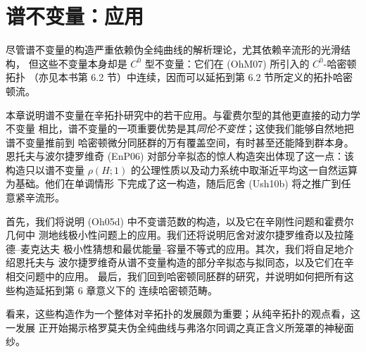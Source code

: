 \chapter{谱不变量：应用}
\label{ch:spectral-applications}

尽管谱不变量的构造严重依赖伪全纯曲线的解析理论，尤其依赖辛流形的光滑结构，
但这些不变量本身却是 $C^0$ 型不变量：它们在 (OhM07) 所引入的 $C^0$-哈密顿拓扑
（亦见本书第 6.2 节）中连续，因而可以延拓到第 6.2 节所定义的拓扑哈密顿流。

本章说明谱不变量在辛拓扑研究中的若干应用。与霍费尔型的其他更直接的动力学不变量
相比，谱不变量的一项重要优势是其\emph{同伦不变性}；这使我们能够自然地把谱不变量推前到
哈密顿微分同胚群的万有覆盖空间，有时甚至还能降到群本身。恩托夫与波尔捷罗维奇
(EnP06) 对部分辛拟态的惊人构造突出体现了这一点：该构造只以谱不变量
$\rho(H;1)$ 的公理性质以及动力系统中取渐近平均这一自然运算为基础。他们在单调情形
下完成了这一构造，随后厄舍 (Ush10b) 将之推广到任意紧辛流形。

首先，我们将说明 (Oh05d) 中不变谱范数的构造，以及它在辛刚性问题和霍费尔几何中
测地线极小性问题上的应用。我们还将说明厄舍对波尔捷罗维奇以及拉隆德--麦克达夫
极小性猜想和最优能量--容量不等式的应用。其次，我们将自足地介绍恩托夫与
波尔捷罗维奇从谱不变量构造的部分辛拟态与拟同态，以及它们在辛相交问题中的应用。
最后，我们回到哈密顿同胚群的研究，并说明如何把所有这些构造延拓到第 6 章意义下的
连续哈密顿范畴。

看来，这些构造作为一个整体对辛拓扑的发展颇为重要；从纯辛拓扑的观点看，这一发展
正开始揭示格罗莫夫伪全纯曲线与弗洛尔同调之真正含义所笼罩的神秘面纱。








